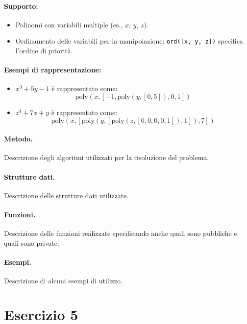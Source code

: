 \documentclass[12pt,twoside]{report}
\begin{document}
\paragraph{Supporto:}
\begin{itemize}
    \item Polinomi con variabili multiple (es., $x$, $y$, $z$).
    \item Ordinamento delle variabili per la manipolazione: \texttt{ord([x, y, z])} specifica l'ordine di priorità.
\end{itemize}

\paragraph{Esempi di rappresentazione:}
\begin{itemize}
    \item $x^3 + 5y - 1$ è rappresentato come:
    \[
    \text{poly}(x, [-1, \text{poly}(y, [0, 5]), 0, 1])
    \]
    \item $z^4 + 7x + y$ è rappresentato come:
    \[
    \text{poly}(x, [\text{poly}(y, [\text{poly}(z, [0, 0, 0, 0, 1]), 1]), 7])
    \]
\end{itemize}

\paragraph{Metodo.} Descrizione degli algoritmi utilizzati per la risoluzione del problema.

\paragraph{Strutture dati.} Descrizione delle strutture dati utilizzate. 

\paragraph{Funzioni.} Descrizione delle funzioni realizzate specificando anche quali sono pubbliche e quali sono private.

\paragraph{Esempi.} Descrizione di alcuni esempi di utilizzo.

\cleardoublepage


\section*{Esercizio 5}
\end{document}
